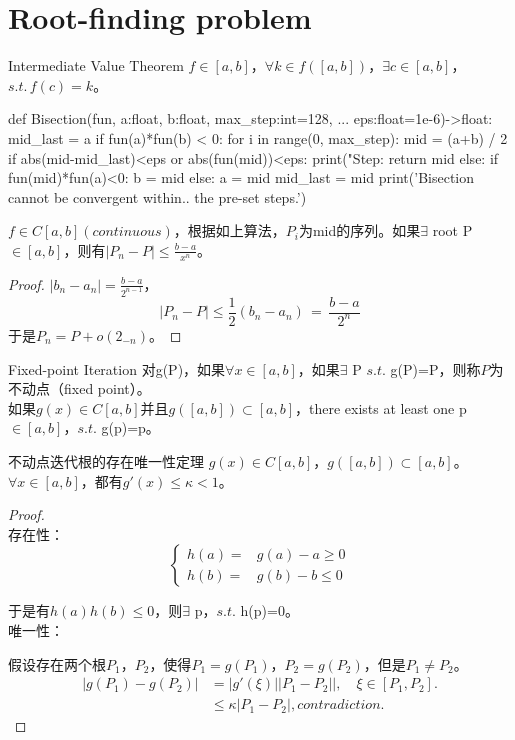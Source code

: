 \section{Root-finding problem}
\begin{theo}{Intermediate Value Theorem}
$f \in [a,b]$，$\forall k \in f([a,b])$，$\exists c\in [a,b]$，$s.t.\,f(c)=k$。
\end{theo}
\begin{python}
def Bisection(fun, a:float, b:float, max_step:int=128, ...
    eps:float=1e-6)->float:
    mid_last = a
    if fun(a)*fun(b) < 0:
        for i in range(0, max_step):
            mid = (a+b) / 2
            if abs(mid-mid_last)<eps or abs(fun(mid))<eps:
                print("Step: %
                return mid
            else:
                if fun(mid)*fun(a)<0:
                    b = mid
                else:
                    a = mid
            mid_last = mid
        print('Bisection cannot be convergent within..
               the pre-set steps.')
\end{python}
\begin{theo}{}
$f\in C[a,b](continuous)$，根据如上算法，$P_i$为mid的序列。如果$\exists$ root P$\in[a,b]$，则有$\left|P_n-P\right|\leq\frac{b-a}{x^n}$。
\end{theo}
\begin{proof}
$\left|b_n-a_n\right|=\frac{b-a}{2^{n-1}}$，
\[
\left|P_n-P\right|\leq\frac{1}{2}(b_n-a_n)\,=\,\frac{b-a}{2^n}
\]
于是$P_n = P + o(2_{-n})$。
\end{proof}
\begin{defn}{Fixed-point Iteration}
对g(P)，如果$\forall x\in [a,b]$，如果$\exists$ P $s.t.$ g(P)=P，则称$P$为不动点（fixed point）。\\
如果$g(x)\in C[a,b]$并且$g([a,b])\subset[a,b]$，there exists at least one p$\in[a,b]$，$s.t.$ g(p)=p。
\end{defn}
\begin{theo}{不动点迭代根的存在唯一性定理}
$g(x)\in C[a,b]$，$g([a,b])\subset[a,b]$。$\forall x\in [a,b]$，都有$g'(x)\leq\kappa<1$。
\end{theo}
\begin{proof}\\
    存在性：
    \begin{equation*}
        \begin{cases}
          h(a) =&g(a)-a \geq 0 \\
          h(b) =&g(b)-b \leq 0
        \end{cases}
    \end{equation*}\par
    于是有$h(a)h(b)\leq 0$，则$\exists$ p，$s.t.$ h(p)=0。\\
    唯一性：\par
    假设存在两个根$P_1$，$P_2$，使得$P_1=g(P_1)$，$P_2=g(P_2)$，但是$P_1\neq P_2$。
    \begin{align*}
        \left|g(P_1)-g(P_2)\right| &= \left|g'(\xi)\right|\left| P_1-P_2|\right|,\quad \xi\in [P_1,P_2]. \\
        &\leq \kappa\left|P_1-P_2\right|, contradiction.
    \end{align*}
\end{proof}
